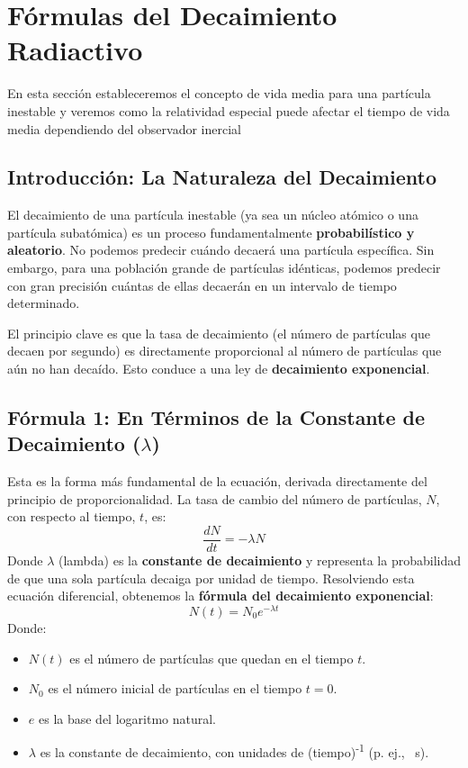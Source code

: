 \documentclass[11pt,a4paper]{article}
\begin{document}

\section{Fórmulas del Decaimiento Radiactivo}
En esta sección estableceremos el concepto de vida media para una partícula inestable y veremos como la relatividad especial puede afectar el tiempo de vida media dependiendo del observador inercial
\subsection*{Introducción: La Naturaleza del Decaimiento}

El decaimiento de una partícula inestable (ya sea un núcleo atómico o una partícula subatómica) es un proceso fundamentalmente \textbf{probabilístico y aleatorio}. No podemos predecir cuándo decaerá una partícula específica. Sin embargo, para una población grande de partículas idénticas, podemos predecir con gran precisión cuántas de ellas decaerán en un intervalo de tiempo determinado.

El principio clave es que la tasa de decaimiento (el número de partículas que decaen por segundo) es directamente proporcional al número de partículas que aún no han decaído. Esto conduce a una ley de \textbf{decaimiento exponencial}.

\subsection*{Fórmula 1: En Términos de la Constante de Decaimiento ($\lambda$)}

Esta es la forma más fundamental de la ecuación, derivada directamente del principio de proporcionalidad. La tasa de cambio del número de partículas, $N$, con respecto al tiempo, $t$, es:
\[ \frac{dN}{dt} = -\lambda N \]
Donde $\lambda$ (lambda) es la \textbf{constante de decaimiento} y representa la probabilidad de que una sola partícula decaiga por unidad de tiempo. Resolviendo esta ecuación diferencial, obtenemos la \textbf{fórmula del decaimiento exponencial}:
\[ \boxed{N(t) = N_0 e^{-\lambda t}} \]
Donde:
\begin{itemize}
    \item $N(t)$ es el número de partículas que quedan en el tiempo $t$.
    \item $N_0$ es el número inicial de partículas en el tiempo $t=0$.
    \item $e$ es la base del logaritmo natural.
    \item $\lambda$ es la constante de decaimiento, con unidades de (tiempo)\textsuperscript{-1} (p. ej., \si{\per\second}).
\end{itemize}
\end{document}
